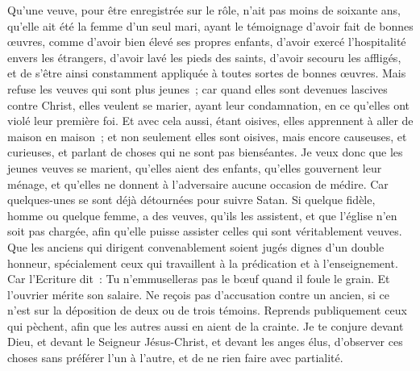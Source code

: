 \begin{multicols}{2}
Qu'une veuve, pour être enregistrée sur le rôle, n'ait pas moins de soixante ans, qu'elle ait été la femme d'un seul mari,
ayant le témoignage d'avoir fait de bonnes œuvres, comme d'avoir bien élevé ses propres enfants, d'avoir exercé l'hospitalité envers les étrangers, d'avoir lavé les pieds des saints, d'avoir secouru les affligés, et de s'être ainsi constamment appliquée à toutes sortes de bonnes œuvres.
Mais refuse les veuves qui sont plus jeunes~; car quand elles sont devenues lascives contre Christ, elles veulent se marier,
ayant leur condamnation, en ce qu'elles ont violé leur première foi.
Et avec cela aussi, étant oisives, elles apprennent à aller de maison en maison~; et non seulement elles sont oisives, mais encore causeuses, et curieuses, et parlant de choses qui ne sont pas bienséantes.
Je veux donc que les jeunes veuves se marient, qu'elles aient des enfants, qu'elles gouvernent leur ménage, et qu'elles ne donnent à l'adversaire aucune occasion de médire.
Car quelques-unes se sont déjà détournées pour suivre Satan.
Si quelque fidèle, homme ou quelque femme, a des veuves, qu'ils les assistent, et que l'église n'en soit pas chargée, afin qu'elle puisse assister celles qui sont véritablement veuves.
Que les anciens qui dirigent convenablement soient jugés dignes d'un double honneur, spécialement ceux qui travaillent à la prédication et à l'enseignement.
Car l'Ecriture dit~: Tu n'emmuselleras pas le bœuf quand il foule le grain. Et l'ouvrier mérite son salaire.
Ne reçois pas d'accusation contre un ancien, si ce n'est sur la déposition de deux ou de trois témoins.
Reprends publiquement ceux qui pèchent, afin que les autres aussi en aient de la crainte.
Je te conjure devant Dieu, et devant le Seigneur Jésus-Christ, et devant les anges élus, d'observer ces choses sans préférer l'un à l'autre, et de ne rien faire avec partialité.

\end{multicols}
